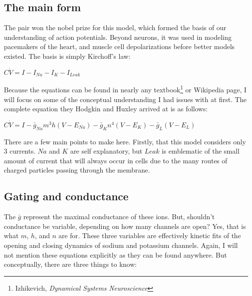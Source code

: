 \documentclass[12pt]{amsart}
\begin{document}
\subsection{The main form} The pair won the nobel prize for this model, which formed the basis of our understanding of action potentials. Beyond neurons, it was used in modeling pacemakers of the heart, and muscle cell depolarizations before better models existed.  The basis is simply Kirchoff's law: 

\bigskip

\begin{center}

    $C\dot{V} = I - I_{Na} - I_{K} - I_{Leak}$
    
\end{center}

\bigskip

Because the equations can be found in nearly any textbook\footnote{Izhikevich, \textit{Dynamical Systems Neuroscience}} or Wikipedia page, I will focus on some of the conceptual understanding I had issues with at first. The complete equation they Hodgkin and Huxley arrived at is as follows: 

\bigskip

\begin{center}

    $C\dot{V} = I - \bar{g}_{Na}m^3h(V - E_{Na}) - \bar{g}_{K}n^4(V - E_{K}) - \bar{g}_{L}(V - E_{L})$
    
\end{center}

\bigskip 

There are a few main points to make here. Firstly, that this model considers only 3 currents. $Na$ and $K$ are self explanatory, but $Leak$ is emblematic of the small amount of current that will always occur in cells due to the many routes of charged particles passing through the membrane.\newline

\subsection{Gating and conductance} The $\bar{g}$ represent the maximal conductance of these ions. But, shouldn't conductance be variable, depending on how many channels are open? Yes, that is what $m$, $h$, and $n$ are for. These three variables are effectively kinetic fits of the opening and closing dynamics of sodium and potassium channels. Again, I will not mention these equations explicitly as they can be found anywhere. But conceptually, there are three things to know:\newline
\end{document}
